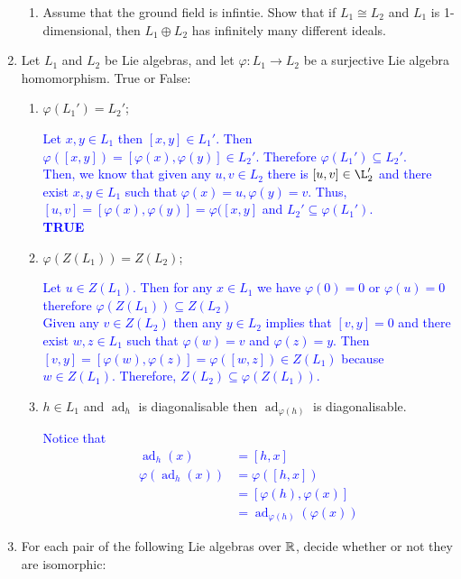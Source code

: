 \documentclass[12pt,a4paper]{report}
\newcommand{\BLUE}[1]{\textcolor{blue}{#1}}
\newcommand{\AD}{\operatorname{ad}}
\begin{document}
\begin{enumerate}[label=2.\arabic*]
\begin{enumerate}[label=(\roman*)]
	\item Assume that the ground field is infintie.  Show that if $L_1 \cong L_2$ and  $L_1$ is 1-dimensional, then $L_1\oplus L_2$ has infinitely many different ideals.

\end{enumerate}

\item Let $L_1$ and $L_2$ be Lie algebras, and let $\varphi : L_1\to L_2$ be a surjective Lie algebra homomorphism.  True or False:
\begin{enumerate}[label=(\alph*)]

	\item $\varphi(L_1') = L_2'$;
	
	\BLUE{Let $x,y \in L_1$ then $[x,y] \in L_1'$.  Then $\varphi([x,y]) = [\varphi(x),\varphi(y)] \in L_2'$.  Therefore $\varphi(L_1') \subseteq L_2'$.\\
	Then, we know that given any $u,v \in L_2$ there is $[u,v]\in \L_2'$ and there exist $x,y \in L_1$ such that $\varphi(x) = u, \varphi(y)=v$.  Thus, $[u,v]=[\varphi(x),\varphi(y)]=\varphi([x,y]$ and $L_2' \subseteq \varphi(L_1')$.\\
	\textbf{TRUE}
	}
	
	\item $\varphi(Z(L_1))=Z(L_2)$;
	
	\BLUE{Let $u \in Z(L_1)$.  Then for any $x\in L_1$ we have $\varphi(0)=0$ or $\varphi(u)=0$ therefore $\varphi(Z(L_1)) \subseteq Z(L_2)$\\
	Given any $v \in Z(L_2)$ then any $y\in L_2$ implies that $[v,y]=0$ and there exist $w,z \in L_1$ such that $\varphi(w)=v$ and $\varphi(z)=y$.  Then $[v,y]=[\varphi(w),\varphi(z)]=\varphi([w,z]) \in Z(L_1)$ because $w \in Z(L_1)$.  Therefore, $Z(L_2) \subseteq \varphi(Z(L_1))$.
	}
	
	\item $h \in L_1$ and $\AD_h$ is diagonalisable then $\AD_{\varphi(h)}$ is diagonalisable.
	
	\BLUE{Notice that
	\begin{align*}
		\AD_h(x) &= [h,x] \\
		\varphi(\AD_h(x)) &= \varphi([h,x]) \\
		&= [\varphi(h), \varphi(x)] \\
		&= \AD_{\varphi(h)}(\varphi(x))
\end{align*}	
	}

\end{enumerate}

\item For each pair of the following Lie algebras over $\mathbb{R}$, decide whether or not they are isomorphic:
\begin{enumerate}[label=(\roman*)]


\end{enumerate}
\end{enumerate}
\end{document}
